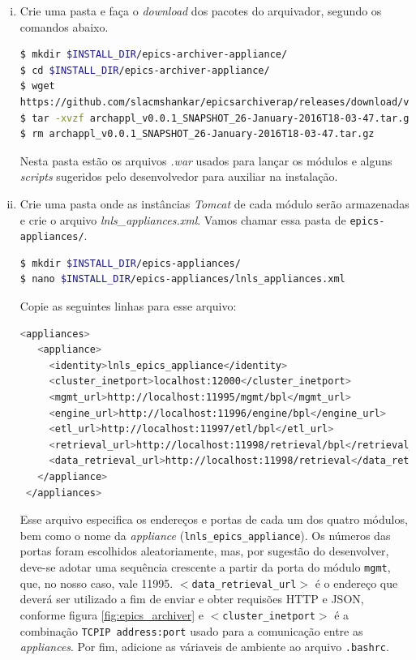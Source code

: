 \begin {enumerate}[i.] 
  \item Crie uma pasta e faça o \textit{download} dos pacotes do arquivador,
  segundo os comandos abaixo. 
\begin{lstlisting}[language=bash, style=nonumbers]
$ mkdir $INSTALL_DIR/epics-archiver-appliance/
$ cd $INSTALL_DIR/epics-archiver-appliance/
$ wget
https://github.com/slacmshankar/epicsarchiverap/releases/download/v0.0.1_SNAPSHOT_26-January-2016/archappl_v0.0.1_SNAPSHOT_26-January-2016T18-03-47.tar.gz
$ tar -xvzf archappl_v0.0.1_SNAPSHOT_26-January-2016T18-03-47.tar.gz
$ rm archappl_v0.0.1_SNAPSHOT_26-January-2016T18-03-47.tar.gz
\end{lstlisting}
	Nesta pasta estão os arquivos \textit{.war}  usados para lançar os módulos e
	alguns \textit{scripts} sugeridos pelo desenvolvedor para auxiliar na
	instalação.
  \item Crie uma pasta onde as instâncias \textit{Tomcat} de cada módulo serão
  armazenadas e crie o arquivo \textit{lnls\_appliances.xml}. Vamos chamar essa
  pasta de \texttt{epics-appliances/}. 
\begin{lstlisting}[language=bash, style=nonumbers]
$ mkdir $INSTALL_DIR/epics-appliances/
$ nano $INSTALL_DIR/epics-appliances/lnls_appliances.xml
\end{lstlisting}
Copie as seguintes linhas para esse arquivo: 
\begin{lstlisting}[language=bash, style=nonumbers]
<appliances>
   <appliance>
     <identity>lnls_epics_appliance</identity>
     <cluster_inetport>localhost:12000</cluster_inetport>
     <mgmt_url>http://localhost:11995/mgmt/bpl</mgmt_url>
     <engine_url>http://localhost:11996/engine/bpl</engine_url>
     <etl_url>http://localhost:11997/etl/bpl</etl_url>
     <retrieval_url>http://localhost:11998/retrieval/bpl</retrieval_url>
     <data_retrieval_url>http://localhost:11998/retrieval</data_retrieval_url>
   </appliance>
 </appliances>
\end{lstlisting} 
Esse arquivo especifica os endereços e portas de cada um dos quatro módulos, bem
como o nome da \textit{appliance} (\texttt{lnls\_epics\_appliance}). Os números
das portas foram escolhidos aleatoriamente, mas, por sugestão do desenvolver,
deve-se adotar uma sequência crescente a partir da porta do módulo
\texttt{mgmt}, que, no nosso caso, vale 11995.
\texttt{\(<\)data\_retrieval\_url\(>\)} é o endereço que deverá ser utilizado
a fim de enviar e obter requisões HTTP e JSON, conforme figura
\ref{fig:epics_archiver} e \texttt{\(<\)cluster\_inetport\(>\)} é a combinação
\texttt{TCPIP address:port} usado para a comunicação entre as
\textit{appliances}. Por fim, adicione as váriaveis de ambiente ao arquivo
\texttt{.bashrc}.


\end{enumerate}
